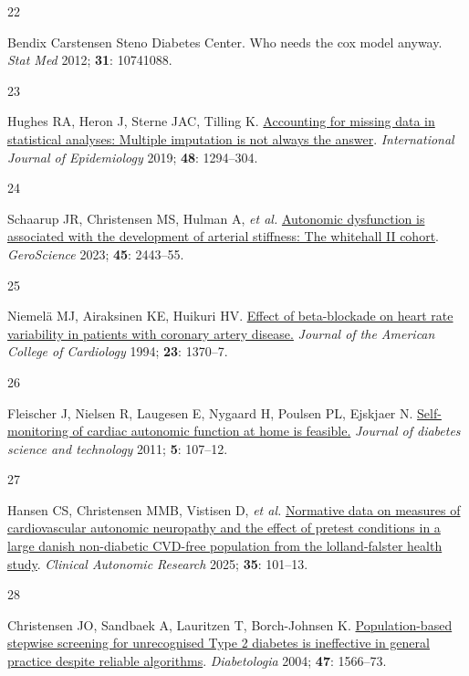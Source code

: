 \documentclass[
  a4paper,
  headsepline=true,
  open=any]{scrbook}
\newlength{\cslhangindent}
\newlength{\csllabelwidth}
\newlength{\cslentryspacingunit} %
\newenvironment{CSLReferences}[2] %
 {%
  \setlength{\parindent}{0pt}
  \ifodd #1
  \let\oldpar\par
  \def\par{\hangindent=\cslhangindent\oldpar}
  \fi
  \setlength{\parskip}{#2\cslentryspacingunit}
 }%
 {}
\newcommand{\CSLLeftMargin}[1]{\parbox[t]{\csllabelwidth}{#1}}
\newcommand{\CSLRightInline}[1]{\parbox[t]{\linewidth - \csllabelwidth}{#1}\break}
\begin{document}
\begin{CSLReferences}{0}{0}
\leavevmode{}%
\CSLLeftMargin{22 }%
\CSLRightInline{Bendix Carstensen Steno Diabetes Center. Who needs the
cox model anyway. \emph{Stat Med} 2012; \textbf{31}: 10741088.}

\leavevmode{}%
\CSLLeftMargin{23 }%
\CSLRightInline{Hughes RA, Heron J, Sterne JAC, Tilling K.
\href{https://doi.org/10.1093/ije/dyz032}{Accounting for missing data in
statistical analyses: Multiple imputation is not always the answer}.
\emph{International Journal of Epidemiology} 2019; \textbf{48}:
1294--304.}

\leavevmode{}%
\CSLLeftMargin{24 }%
\CSLRightInline{Schaarup JR, Christensen MS, Hulman A, \emph{et al.}
\href{https://doi.org/10.1007/s11357-023-00762-0}{Autonomic dysfunction
is associated with the development of arterial stiffness: The whitehall
II cohort}. \emph{GeroScience} 2023; \textbf{45}: 2443--55.}

\leavevmode{}%
\CSLLeftMargin{25 }%
\CSLRightInline{Niemelä MJ, Airaksinen KE, Huikuri HV.
\href{https://doi.org/10.1016/0735-1097(94)90379-4}{Effect of
beta-blockade on heart rate variability in patients with coronary artery
disease.} \emph{Journal of the American College of Cardiology} 1994;
\textbf{23}: 1370--7.}

\leavevmode{}%
\CSLLeftMargin{26 }%
\CSLRightInline{Fleischer J, Nielsen R, Laugesen E, Nygaard H, Poulsen
PL, Ejskjaer N.
\href{https://doi.org/10.1177/193229681100500115}{Self-monitoring of
cardiac autonomic function at home is feasible.} \emph{Journal of
diabetes science and technology} 2011; \textbf{5}: 107--12.}

\leavevmode{}%
\CSLLeftMargin{27 }%
\CSLRightInline{Hansen CS, Christensen MMB, Vistisen D, \emph{et al.}
\href{https://doi.org/10.1007/s10286-024-01069-6}{Normative data on
measures of cardiovascular autonomic neuropathy and the effect of
pretest conditions in a large danish non-diabetic CVD-free population
from the lolland-falster health study}. \emph{Clinical Autonomic
Research} 2025; \textbf{35}: 101--13.}

\leavevmode{}%
\CSLLeftMargin{28 }%
\CSLRightInline{Christensen JO, Sandbaek A, Lauritzen T, Borch-Johnsen
K. \href{https://doi.org/10.1007/s00125-004-1496-2}{Population-based
stepwise screening for unrecognised Type 2 diabetes is ineffective in
general practice despite reliable algorithms}. \emph{Diabetologia} 2004;
\textbf{47}: 1566--73.}


\end{CSLReferences}
\end{document}
